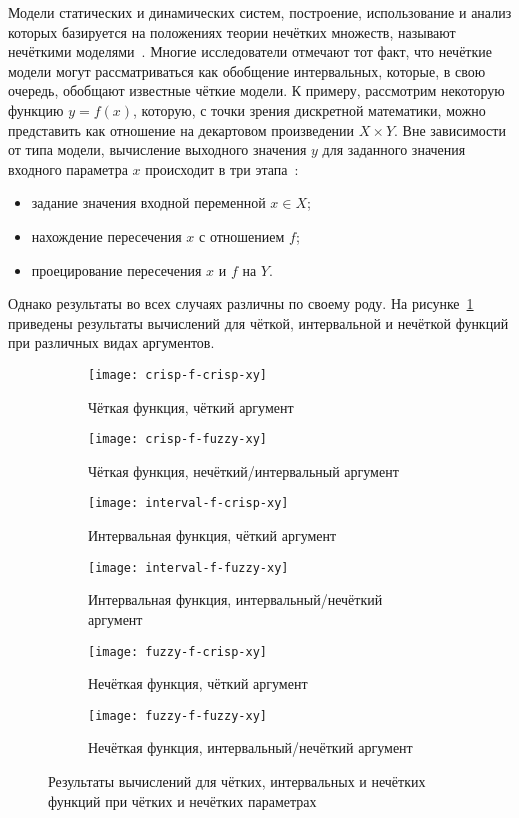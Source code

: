 Модели статических и динамических систем, построение, использование и анализ которых базируется на положениях теории нечётких множеств, называют нечёткими моделями~\cite{Borisov_Fedulov}. Многие исследователи отмечают тот факт, что нечёткие модели могут рассматриваться как обобщение интервальных, которые, в свою очередь, обобщают известные чёткие модели. К примеру, рассмотрим некоторую функцию $y=f \left(x \right)$, которую, с точки зрения дискретной математики, можно представить как отношение на декартовом произведении $X \times Y$. Вне зависимости от типа модели, вычисление выходного значения $y$ для заданного значения входного параметра $x$ происходит в три этапа~\cite{Borisov_Fedulov}:
\begin{itemize}
	\item задание значения входной переменной $x \in X$;
	\item нахождение пересечения $x$ с отношением $f$;
	\item проецирование пересечения $x$ и $f$ на $Y$.
\end{itemize}

Однако результаты во всех случаях различны по своему роду. На рисунке~\ref{fig:functypes-restypes} приведены результаты вычислений для чёткой, интервальной и нечёткой функций при различных видах аргументов.

\begin{figure}[pH]
  \centering
  \begin{subfigure}[t]{0.4\textwidth}
    \texttt{[image: crisp-f-crisp-xy]}
    \caption{Чёткая функция, чёткий аргумент}
  \end{subfigure}
  \quad
  \begin{subfigure}[t]{0.4\textwidth}
    \texttt{[image: crisp-f-fuzzy-xy]}
    \caption{Чёткая функция, нечёткий/интервальный аргумент}
  \end{subfigure}
  
  \begin{subfigure}[h]{0.4\textwidth}
    \texttt{[image: interval-f-crisp-xy]}
    \caption{Интервальная функция, чёткий аргумент}
  \end{subfigure}
  \quad
  \begin{subfigure}[h]{0.4\textwidth}
    \texttt{[image: interval-f-fuzzy-xy]}
    \caption{Интервальная функция, интервальный/нечёткий аргумент}
  \end{subfigure}
  
  \begin{subfigure}[b]{0.4\textwidth}
    \texttt{[image: fuzzy-f-crisp-xy]}
    \caption{Нечёткая функция, чёткий аргумент}
  \end{subfigure}
  \quad
  \begin{subfigure}[b]{0.4\textwidth}
    \texttt{[image: fuzzy-f-fuzzy-xy]}
    \caption{Нечёткая функция, интервальный/нечёткий аргумент}
  \end{subfigure}
  \caption{Результаты вычислений для чётких, интервальных и нечётких функций при чётких и нечётких параметрах}
  \label{fig:functypes-restypes}
\end{figure}

